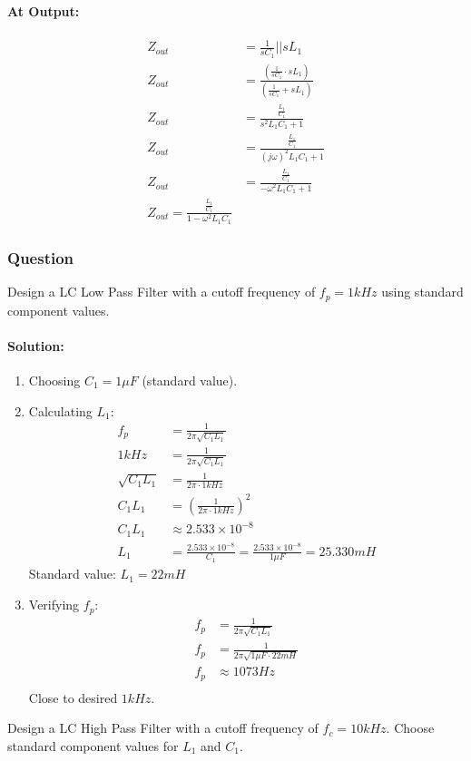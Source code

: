 \begin{enumerate}
    \paragraph{At Output:}
      \begin{align*}
        Z_{out} &= \frac{1}{sC_1} || sL_1 \\
        Z_{out} &= \frac{\left( \frac{1}{sC_1} \cdot sL_1 \right)}{\left( \frac{1}{sC_1} + sL_1 \right)} \\
        Z_{out} &= \frac{\frac{L_1}{C_1}}{s^2 L_1 C_1 + 1} \\
        Z_{out} &= \frac{\frac{L_1}{C_1}}{(j \omega)^2 L_1 C_1 + 1} \\
        Z_{out} &= \frac{\frac{L_1}{C_1}}{- \omega^2 L_1 C_1 + 1} \\
        Z_{out} = \frac{\frac{L_1}{C_1}}{1 - \omega^2 L_1 C_1}
      \end{align*}
\end{enumerate}

\subsubsection{Question}
Design a LC Low Pass Filter with a cutoff frequency of
\(f_p = 1 kHz\) using standard component values.
\paragraph{Solution:}
\begin{enumerate}
  \item Choosing \(C_1 = 1 \mu F\) (standard value).
  \item Calculating \(L_1\):
    \begin{align*}
      f_p &= \frac{1}{2 \pi \sqrt{C_1L_1}} \\
      1 kHz &= \frac{1}{2 \pi \sqrt{C_1L_1}} \\
      \sqrt{C_1L_1} &= \frac{1}{2 \pi \cdot 1 kHz} \\
      C_1L_1 &= \left( \frac{1}{2 \pi \cdot 1 kHz} \right)^2 \\
      C_1L_1 &\approx 2.533 \times 10^{-8} \\
      L_1 &= \frac{2.533 \times 10^{-8}}{C_1} = \frac{2.533 \times 10^{-8}}{1 \mu F} = 25.330 mH
    \end{align*}
    Standard value: \(L_1 = 22 mH\)
  \item Verifying \(f_p\):
    \begin{align*}
      f_p &= \frac{1}{2 \pi \sqrt{C_1L_1}} \\
      f_p &= \frac{1}{2 \pi \sqrt{1 \mu F \cdot 22 mH}} \\
      f_p &\approx 1073 Hz \\
    \end{align*}
    Close to desired \(1 kHz\).
\end{enumerate}
Design a LC High Pass Filter with a cutoff frequency of
\(f_c = 10 kHz\). Choose standard component values for \(L_1\)
and \(C_1\).
